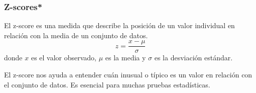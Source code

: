 \documentclass[aspectratio=169]{beamer}
\begin{document}














\begin{frame}
\frametitle{Z-scores*}
El z-score es una medida que describe la posición de un valor individual en relación con la media de un conjunto de datos. 
\[ z = \frac{x - \mu}{\sigma} \]
donde \( x \) es el valor observado, \( \mu \) es la media y \( \sigma \) es la desviación estándar.

\vfill

El z-score nos ayuda a entender cuán inusual o típico es un valor en relación con el conjunto de datos. Es esencial para muchas pruebas estadísticas.


\end{frame}
\end{document}
